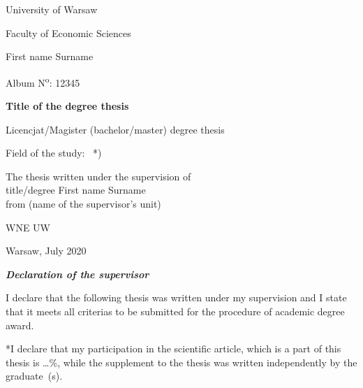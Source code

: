 \documentclass[12pt,a4paper]{article}
\begin{document}
\begin{titlepage}
\centering
{\large University of Warsaw\par}
{\large Faculty of Economic Sciences\par}
\vspace{2.5cm}
{\large First name Surname\par}
{\large Album N\textsuperscript{o}: 12345\par}
\vspace{2.5cm}
{\LARGE\bfseries Title of the degree thesis\par}
\vspace{2cm}
{\large Licencjat/Magister (bachelor/master) degree thesis\par}
\vspace{0.5cm}
{\large Field of the study: \dotfill\ *)\par}
\vfill
\begin{flushright}
\large
The thesis written under the supervision of\\
title/degree First name Surname\\
from (name of the supervisor's unit)
\end{flushright}
\vfill
{\large WNE UW\par}
{\large Warsaw, July 2020\par}
\end{titlepage}

\clearpage
{}

\begin{center}\textbf{\textit{Declaration of the supervisor}}\end{center}
\vspace{0.5\baselineskip}

I declare that the following thesis was written under my supervision and I
state that it meets all criterias to be submitted for the procedure of
academic degree award.

*I declare that my participation in the scientific article, which is a part
of this thesis is \dots\%, while the supplement to the thesis was written
independently by the graduate~(s).
\end{document}
